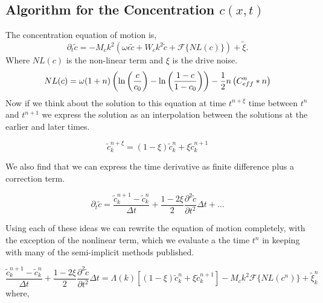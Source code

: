 \subsection{Algorithm for the Concentration $c(x,t)$} %

The concentration equation of motion is, 
%
\begin{equation}
    \partial_t \tilde{c} = 
        - M_c k^2\left(\omega\epsilon\tilde{c} 
        + W_c k^2\tilde{c} + \mathcal{F}\lbrace NL(c) \rbrace\right) 
        + \tilde{\xi}.
\end{equation}
%
Where $NL(c)$ is the non-linear term and $\xi$ is the drive noise. 
%
\begin{equation}
    NL(c) = 
        \omega(1+n)\left(\ln\left(\frac{c}{c_0}\right) 
      - \ln\left(\frac{1-c}{1-c_0}\right)\right) 
      - \frac{1}{2} n \left(C_{eff}^n\ast n\right)
\end{equation}
%
Now if we think about the solution to this equation at time $t^{n+\xi}$ time
between $t^n$ and $t^{n+1}$ we express the solution as an interpolation between
the solutions at the earlier and later times.

\begin{equation}
    \tilde{c}_k^{n + \xi} = (1-\xi)\tilde{c}_k^n + \xi\tilde{c}_k^{n+1}
\end{equation}

We also find that we can express the time derivative as finite difference plus
a correction term. 

\begin{equation}
\partial_t \tilde{c} = \frac{\tilde{c}_k^{n+1} - \tilde{c}_k^{n}}{\Delta t} + 
\frac{1 - 2\xi}{2} \frac{\partial^2 \tilde{c}}{\partial t^2}\Delta t + ...
\end{equation}

Using each of these ideas we can rewrite the equation of motion completely,
with the exception of the nonlinear term, which we evaluate a the time $t^n$ in
keeping with many of the semi-implicit methods published.

\begin{equation}
\frac{\tilde{c}_k^{n+1} - \tilde{c}_k^{n}}{\Delta t} + 
\frac{1 - 2\xi}{2} \frac{\partial^2 \tilde{c}}{\partial t^2}\Delta t = 
\Lambda(k)\left[(1-\xi)\tilde{c}_k^n + \xi\tilde{c}_k^{n+1}\right] - M_c k^2 \mathcal{F}\lbrace NL(c^n)\rbrace + \tilde{\xi}_k^n
\end{equation}
where, 

